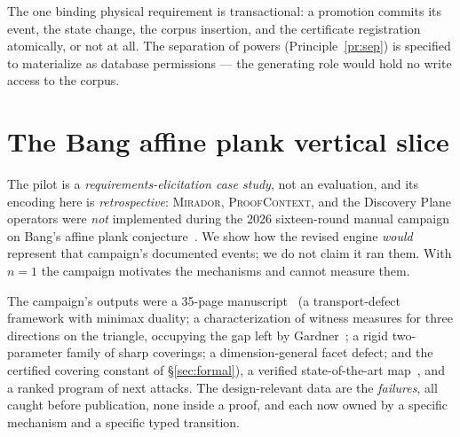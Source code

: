 \documentclass[11pt]{amsart}
\theoremstyle{definition}
\theoremstyle{remark}
\newcommand{\mirador}{\textsc{Mirador}}
\newcommand{\pc}{\textsc{ProofContext}}
\begin{document}
The one binding physical requirement is transactional: a promotion commits its
event, the state change, the corpus insertion, and the certificate registration
atomically, or not at all. The separation of powers (Principle~\ref{pr:sep})
is specified to materialize as database permissions --- the generating role
would hold no write access to the corpus.

\section{The Bang affine plank vertical slice}\label{sec:pilot}

The pilot is a \emph{requirements-elicitation case study}, not an evaluation, and
its encoding here is \emph{retrospective}: \mirador{}, \pc{}, and the Discovery
Plane operators were \emph{not} implemented during the 2026 sixteen-round manual
campaign on Bang's affine plank conjecture~\cite{Bang51,Ball91,BY26,Verreault26}.
We show how the revised engine \emph{would} represent that campaign's documented
events; we do not claim it ran them. With $n=1$ the campaign motivates the
mechanisms and cannot measure them.

The campaign's outputs were a 35-page manuscript~\cite{Lucius26} (a
transport-defect framework with minimax duality; a characterization of witness
measures for three directions on the triangle, occupying the gap left by
Gardner~\cite{Gardner88}; a rigid two-parameter family of sharp coverings; a
dimension-general facet defect; and the certified covering constant of
\S\ref{sec:formal}), a verified state-of-the-art map~\cite{BY26,AKP19,GKP22,MOM26},
and a ranked program of next attacks. The design-relevant data are the
\emph{failures}, all caught before publication, none inside a proof, and each now
owned by a specific mechanism and a specific typed transition.
\end{document}
